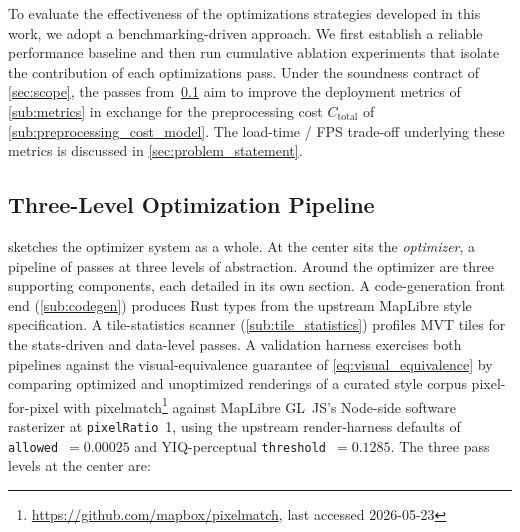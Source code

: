 To evaluate the effectiveness of the optimizations strategies developed in this work, we adopt a benchmarking-driven approach.
We first establish a reliable performance baseline and then run cumulative ablation experiments that isolate the contribution of each optimizations pass.
Under the soundness contract of \cref{sec:scope}, the passes from~\cref{sub:pipeline} aim to improve the deployment metrics of \cref{sub:metrics} in exchange for the preprocessing cost $C_\text{total}$ of \cref{sub:preprocessing_cost_model}.
The load-time / FPS trade-off underlying these metrics is discussed in \cref{sec:problem_statement}.

\subsection{Three-Level Optimization Pipeline}\label{sub:pipeline}

 sketches the optimizer system as a whole.
At the center sits the \emph{optimizer}, a pipeline of passes at three levels of abstraction.
Around the optimizer are three supporting components, each detailed in its own section.
A code-generation front end (\cref{sub:codegen}) produces Rust types from the upstream MapLibre style specification.
A tile-statistics scanner (\cref{sub:tile_statistics}) profiles \ac{MVT} tiles for the stats-driven and data-level passes.
A validation harness exercises both pipelines against the visual-equivalence guarantee of \cref{eq:visual_equivalence} by comparing optimized and unoptimized renderings of a curated style corpus pixel-for-pixel with pixelmatch\footnote{\url{https://github.com/mapbox/pixelmatch}, last accessed 2026-05-23} against MapLibre GL~JS's Node-side software rasterizer at \texttt{pixelRatio}~1, using the upstream render-harness defaults of \texttt{allowed}~$=0.00025$ and YIQ-perceptual \texttt{threshold}~$=0.1285$.
The three pass levels at the center are:


